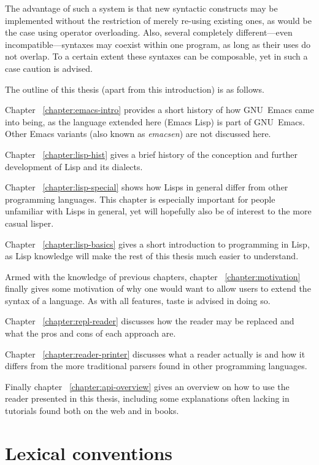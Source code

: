 \documentclass[a4paper,10pt,twoside]{report}
\newcommand{\el}{Emacs Lisp}
\newcommand{\emacs}{GNU~Emacs}
\begin{document}
The advantage of such a system is that new syntactic constructs may be
implemented without the restriction of merely re-using existing ones, as would
be the case using operator overloading.  Also, several completely
different---even incompatible---syntaxes may coexist within one program, as long
as their uses do not overlap.  To a certain extent these syntaxes can be
composable, yet in such a case caution is advised.

The outline of this thesis (apart from this introduction) is as follows.

Chapter ~\ref{chapter:emacs-intro} provides a short history of how \emacs{} came
into being, as the language extended here (\el{}) is part of \emacs{}.  Other
Emacs variants (also known as \emph{emacsen}) are not discussed here.

Chapter ~\ref{chapter:lisp-hist} gives a brief history of the conception and further
development of Lisp and its dialects.

Chapter ~\ref{chapter:lisp-special} shows how Lisps in general differ from other
programming languages.  This chapter is especially important for people
unfamiliar with Lisps in general, yet will hopefully also be of interest to the
more casual lisper.

Chapter ~\ref{chapter:lisp-basics} gives a short introduction to programming in
Lisp, as Lisp knowledge will make the rest of this thesis much easier to
understand.

Armed with the knowledge of previous chapters, chapter ~\ref{chapter:motivation}
finally gives some motivation of why one would want to allow users to extend the
syntax of a language.  As with all features, taste is advised in doing so.

Chapter ~\ref{chapter:repl-reader} discusses how the reader may be replaced and
what the pros and cons of each approach are.

Chapter ~\ref{chapter:reader-printer} discusses what a reader actually is and how
it differs from the more traditional parsers found in other programming
languages.

Finally chapter ~\ref{chapter:api-overview} gives an overview on how to use the
reader presented in this thesis, including some explanations often lacking in
tutorials found both on the web and in books.

\section{Lexical conventions}
\label{sec:lexical-conv}
\end{document}
